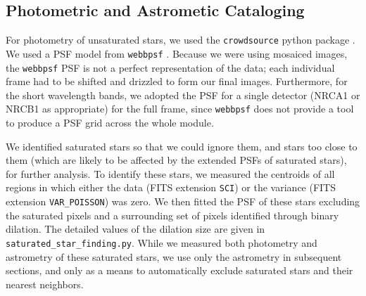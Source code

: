 \documentclass[times,astrosymb,twocolumn]{aastex631}
\def\rr#1{#1}
\begin{document}
\subsection{Photometric and Astrometic Cataloging}
\label{sec:photometry}
For photometry of unsaturated stars, we use\rr{d} the \texttt{crowdsource} python package \citep{Schlafly2021}.
We used a PSF model from \texttt{webbpsf} \citep{Perrin2015}.
Because we were using mosaiced images, the \texttt{webbpsf} PSF is not a perfect representation of the data; each individual frame had to be shifted and drizzled to form our final images.
Furthermore, for the short wavelength bands, we adopted the PSF for a single detector (NRCA1 or NRCB1 as appropriate) for the full frame, since \texttt{webbpsf} does not provide a tool to produce a PSF grid across the whole module.

\rr{We identified saturated stars so that we could ignore them, and stars too close to them (which are likely to be affected by the extended PSFs of saturated stars), for further analysis.}
\rr{To identify these stars, we measured the centroids of all regions in which either the data (FITS extension \texttt{SCI}) or the variance (FITS extension \texttt{VAR\_POISSON}) was zero.}
\rr{We then fitted the PSF of these stars excluding the saturated pixels and a surrounding set of pixels identified through binary dilation.}
\rr{The detailed values of the dilation size are given in \texttt{saturated\_star\_finding.py}.}
\rr{While we measured both photometry and astrometry of these saturated stars, we use only the astrometry in subsequent sections, and only as a means to automatically exclude saturated stars and their nearest neighbors.}
\end{document}
